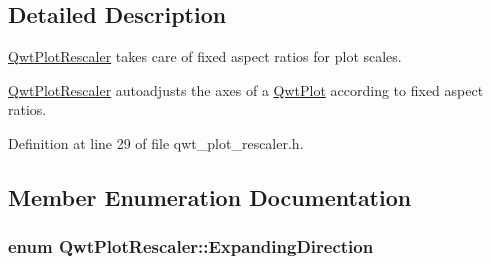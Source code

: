 \subsection{Detailed Description}
\hyperlink{class_qwt_plot_rescaler}{Qwt\-Plot\-Rescaler} takes care of fixed aspect ratios for plot scales. 

\hyperlink{class_qwt_plot_rescaler}{Qwt\-Plot\-Rescaler} autoadjusts the axes of a \hyperlink{class_qwt_plot}{Qwt\-Plot} according to fixed aspect ratios. 

Definition at line 29 of file qwt\-\_\-plot\-\_\-rescaler.\-h.



\subsection{Member Enumeration Documentation}
\hypertarget{class_qwt_plot_rescaler_a1c314e9513cef076a79381111aa67585}{
\subsubsection[{Expanding\-Direction}]{\setlength{\rightskip}{0pt plus 5cm}enum {\bf Qwt\-Plot\-Rescaler\-::\-Expanding\-Direction}}}\label{class_qwt_plot_rescaler_a1c314e9513cef076a79381111aa67585}
